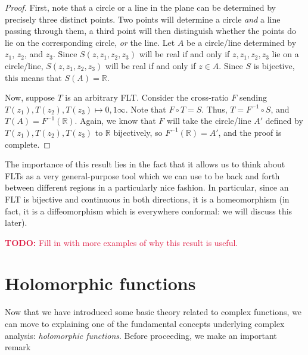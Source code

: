 \documentclass[aps,pra,showpacs,notitlepage,onecolumn,superscriptaddress,nofootinbib]{revtex4-1}
\newcommand{\pop}[1]{\textcolor{crimson}{#1}}
\theoremstyle{definition}
\newcommand{\hhrulefill}{\hspace{-1.5em} \hrulefill}
\begin{document}
\begin{proof}
  First, note that a circle or a line in the plane can be determined by precisely three distinct points. Two points will determine a circle \emph{and} a line passing through them, a third point will then
  distinguish whether the points do lie on the corresponding circle, \emph{or} the line. Let $A$ be a circle/line determined by $z_1$, $z_2$, and $z_3$. Since $S(z, z_1, z_2, z_3)$ will be real
  if and only if $z, z_1, z_2, z_3$ lie on a circle/line, $S(z, z_1, z_2, z_3)$ will be real if and only if $z \in A$. Since $S$ is bijective, this means that $S(A) = \mathbb{R}$.

  Now, suppose $T$ is an arbitrary FLT. Consider the cross-ratio $F$ sending $T(z_1), T(z_2), T(z_3) \mapsto 0, 1 \infty$. Note that $F \circ T = S$. Thus, $T = F^{-1} \circ S$, and
  $T(A) = F^{-1}(\mathbb{R})$. Again, we know that $F$ will take the circle/line $A'$ defined by $T(z_1), T(z_2), T(z_3)$ to $\mathbb{R}$ bijectively, so $F^{-1}(\mathbb{R}) = A'$, and the proof is complete.
\end{proof}

The importance of this result lies in the fact that it allows us to think about FLTs as a very general-purpose tool which we can use to be back and forth between different regions in a particularly nice fashion.
In particular, since an FLT is bijective and continuous in both directions, it is a homeomorphism (in fact, it is a diffeomorphism which is everywhere conformal: we will discuss this later).
\newline

\noindent \pop{\textbf{TODO:} Fill in with more examples of why this result is useful.}

\section{Holomorphic functions}

\noindent Now that we have introduced some basic theory related to complex functions, we can move to explaining one of the fundamental concepts underlying complex analysis: \emph{holomorphic functions}.
Before proceeding, we make an important remark

\hhrulefill
\end{document}
